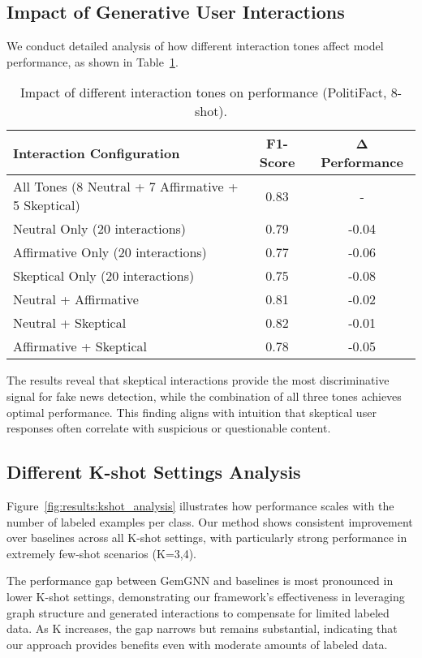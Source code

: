 \subsection{Impact of Generative User Interactions}

We conduct detailed analysis of how different interaction tones affect model performance, as shown in Table~\ref{tab:ablation:tones}.

\begin{table}[htbp]
\centering
\caption{Impact of different interaction tones on performance (PolitiFact, 8-shot).}
\label{tab:ablation:tones}
\begin{tabular}{lcc}
\toprule
\textbf{Interaction Configuration} & \textbf{F1-Score} & \textbf{Δ Performance} \\
\midrule
All Tones (8 Neutral + 7 Affirmative + 5 Skeptical) & 0.83 & - \\
\midrule
Neutral Only (20 interactions) & 0.79 & -0.04 \\
Affirmative Only (20 interactions) & 0.77 & -0.06 \\
Skeptical Only (20 interactions) & 0.75 & -0.08 \\
\midrule
Neutral + Affirmative & 0.81 & -0.02 \\
Neutral + Skeptical & 0.82 & -0.01 \\
Affirmative + Skeptical & 0.78 & -0.05 \\
\bottomrule
\end{tabular}
\end{table}

The results reveal that skeptical interactions provide the most discriminative signal for fake news detection, while the combination of all three tones achieves optimal performance. This finding aligns with intuition that skeptical user responses often correlate with suspicious or questionable content.

\subsection{Different K-shot Settings Analysis}

Figure~\ref{fig:results:kshot_analysis} illustrates how performance scales with the number of labeled examples per class. Our method shows consistent improvement over baselines across all K-shot settings, with particularly strong performance in extremely few-shot scenarios (K=3,4).

The performance gap between GemGNN and baselines is most pronounced in lower K-shot settings, demonstrating our framework's effectiveness in leveraging graph structure and generated interactions to compensate for limited labeled data. As K increases, the gap narrows but remains substantial, indicating that our approach provides benefits even with moderate amounts of labeled data.

